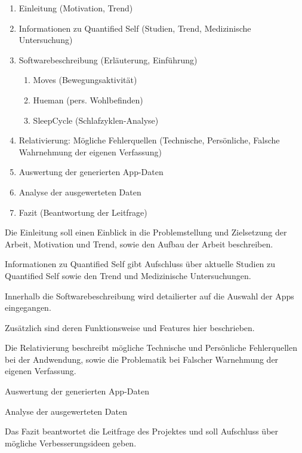 \begin{enumerate}
\def\labelenumi{\arabic{enumi}.}
\itemsep1pt\parskip0pt
\item
  Einleitung (Motivation, Trend)
\item
  Informationen zu Quantified Self (Studien, Trend, Medizinische
  Untersuchung)
\item
  Softwarebeschreibung (Erläuterung, Einführung)

  \begin{enumerate}
  \def\labelenumii{\alph{enumii}.}
  \itemsep1pt\parskip0pt
  \item
    Moves (Bewegungsaktivität)\\
  \item
    Hueman (pers. Wohlbefinden)\\
  \item
    SleepCycle (Schlafzyklen-Analyse)
  \end{enumerate}
\item
  Relativierung: Mögliche Fehlerquellen (Technische, Persönliche,
  Falsche Wahrnehmung der eigenen Verfassung)
\item
  Auswertung der generierten App-Daten
\item
  Analyse der ausgewerteten Daten
\item
  Fazit (Beantwortung der Leitfrage)
\end{enumerate}

Die Einleitung soll einen Einblick in die Problemstellung und Zielsetzung der Arbeit, Motivation und Trend, sowie den Aufbau der Arbeit beschreiben.

Informationen zu Quantified Self gibt Aufschluss über aktuelle Studien zu Quantified Self sowie den Trend und Medizinische Untersuchungen.

Innerhalb die Softwarebeschreibung wird detailierter auf die Auswahl der Apps eingegangen. 

Zusätzlich sind deren Funktionsweise und Features hier beschrieben.

Die Relativierung beschreibt mögliche Technische und Persönliche Fehlerquellen bei der Andwendung, sowie die Problematik bei Falscher Warnehmung der eigenen Verfassung.

Auswertung der generierten App-Daten

Analyse der ausgewerteten Daten

Das Fazit beantwortet die Leitfrage des Projektes und soll Aufschluss über mögliche Verbesserungsideen geben.

